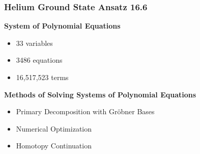\documentclass{beamer}
\begin{document}
\begin{frame}
\frametitle{Helium Ground State Ansatz 16.6}
\begin{center}
\bf
System of Polynomial Equations
\end{center}
\begin{itemize}
\item 33 variables
\item 3486 equations
\item 16,517,523 terms
\end{itemize}

\vskip 24pt

\begin{center}
\bf
Methods of Solving Systems of Polynomial Equations
\end{center}

\begin{itemize}
\item Primary Decomposition with Gr\"obner Bases
\item Numerical Optimization
\item Homotopy Continuation
\end{itemize}
\end{frame}

\end{document}
